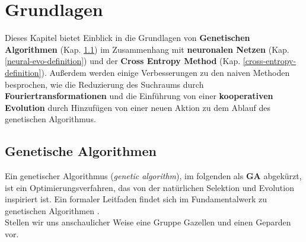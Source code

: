 
\chapter{Grundlagen}

Dieses Kapitel bietet Einblick in die Grundlagen von \textbf{Genetischen Algorithmen} (Kap. \ref{ga-my-definition}) im Zusammenhang mit \textbf{neuronalen Netzen} (Kap. \ref{neural-evo-definition}) und der \textbf{Cross Entropy Method} (Kap. \ref{cross-entropy-definition}). Außerdem werden einige Verbesserungen zu den naiven Methoden besprochen, wie die Reduzierung des Suchraums durch \textbf{Fouriertransformationen} und die Einführung von einer \textbf{kooperativen Evolution} durch Hinzufügen von einer neuen Aktion zu dem Ablauf des genetischen Algorithmus.

    \section{Genetische Algorithmen} \label{ga-my-definition}


        Ein genetischer Algorithmus (\textit{genetic algorithm}), im folgenden als \textbf{GA} abgekürzt, ist ein Optimierungsverfahren, das von der natürlichen Selektion und Evolution inspiriert ist. Ein formaler Leitfaden findet sich im Fundamentalwerk zu genetischen Algorithmen \cite{ga}.\\[2mm]
        Stellen wir uns anschaulicher Weise eine Gruppe Gazellen und einen Geparden vor.\\

